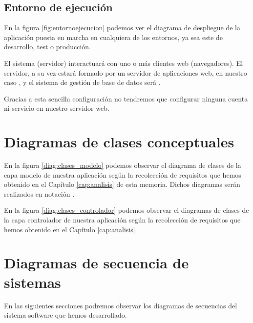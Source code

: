 \subsection{Entorno de ejecución}
En la figura \ref{fig:entornoejecucion} podemos ver el diagrama de despliegue de
la aplicación puesta en marcha en cualquiera de los entornos, ya sea este de
desarrollo, test o producción.


El sistema (servidor) interactuará con uno o más clientes web (navegadores). El
servidor, a su vez estará formado por un servidor de aplicaciones web, en
nuestro caso , y el sistema de gestión de base de datos será
.

Gracias a esta sencilla configuración no tendremos que configurar ninguna cuenta
ni servicio en nuestro servidor web.

\clearpage
\section{Diagramas de clases conceptuales}
En la figura \ref{diag:clases_modelo} podemos observar el diagrama de clases de
la capa modelo de nuestra aplicación según la recolección de requisitos que
hemos obtenido en el Capítulo \ref{cap:analisis} de esta memoria. Dichos
diagramas serán realizados en notación  \cite{uml:distilled_standard}.


\clearpage

En la figura \ref{diag:clases_controlador} podemos observar el diagramas de
clases de la capa controlador de nuestra aplicación según la recolección de
requisitos que hemos obtenido en el Capítulo \ref{cap:analisis}.


\section{Diagramas de secuencia de sistemas}

En las siguientes secciones podremos observar los diagramas de secuencias del
sistema software que hemos desarrollado.


